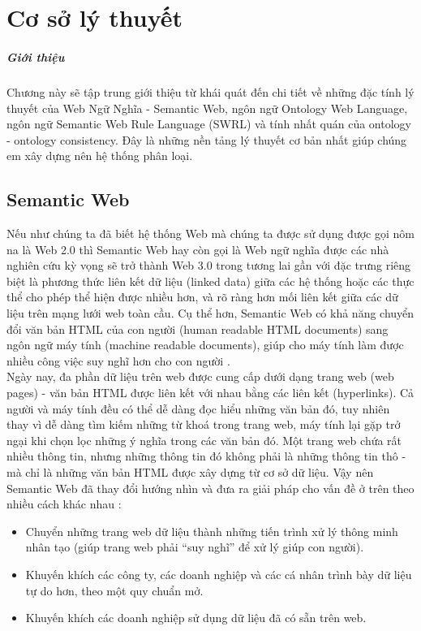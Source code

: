 \chapter{Cơ sở lý thuyết}
\paragraph{Giới thiệu} Chương này sẽ tập trung giới thiệu từ khái quát đến chi tiết về những đặc tính lý thuyết của Web Ngữ Nghĩa - Semantic Web, ngôn ngữ Ontology Web Language, ngôn ngữ Semantic Web Rule Language (SWRL) và tính nhất quán của ontology - ontology consistency. Đây là những nền tảng lý thuyết cơ bản nhất giúp chúng em xây dựng nên hệ thống phân loại.

\section{Semantic Web}
Nếu như chúng ta đã biết hệ thống Web mà chúng ta được sử dụng được gọi nôm na là Web 2.0 thì Semantic Web hay còn gọi là Web ngữ nghĩa được các nhà nghiên cứu kỳ vọng sẽ trở thành Web 3.0 trong tương lai gần với đặc trưng riêng biệt là phương thức liên kết dữ liệu (linked data) giữa các hệ thống hoặc các thực thể cho phép thể hiện được nhiều hơn, và rõ ràng hơn mối liên kết giữa các dữ liệu trên mạng lưới web toàn cầu. Cụ thể hơn, Semantic Web có khả năng chuyển đổi văn bản HTML của con người (human readable HTML documents) sang ngôn ngữ máy tính (machine readable documents), giúp cho máy tính làm được nhiều công việc suy nghĩ hơn cho con người \cite{semantic1}.
\\
Ngày nay, đa phần dữ liệu trên web được cung cấp dưới dạng trang web (web pages) - văn bản HTML được liên kết với nhau bằng các liên kết (hyperlinks). Cả người và máy tính đều có thể dễ dàng đọc hiểu những văn bản đó, tuy nhiên thay vì dễ dàng tìm kiếm những từ khoá trong trang web, máy tính lại gặp trở ngại khi chọn lọc những ý nghĩa trong các văn bản đó. Một trang web chứa rất nhiều thông tin, nhưng những thông tin đó không phải là những thông tin thô - mà chỉ là những văn bản HTML được xây dựng từ cơ sở dữ liệu. Vậy nên Semantic Web đã thay đổi hướng nhìn và đưa ra giải pháp cho vấn đề ở trên theo nhiều cách khác nhau :
\begin{itemize}
	\item Chuyển những trang web dữ liệu thành những tiến trình xử lý thông minh nhân tạo (giúp trang web phải “suy nghĩ” để xử lý giúp con người).
	\item Khuyến khích các công ty, các doanh nghiệp và các cá nhân trình bày dữ liệu tự do hơn, theo một quy chuẩn mở.
	\item Khuyến khích các doanh nghiệp sử dụng dữ liệu đã có sẵn trên web.
\end{itemize}
% 
